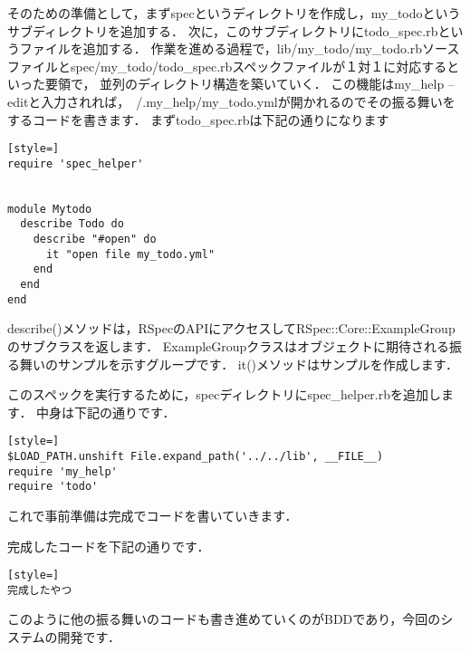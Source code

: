 そのための準備として，まずspecというディレクトリを作成し，my\_todoというサブディレクトリを追加する．
次に，このサブディレクトリにtodo\_spec.rbというファイルを追加する．
作業を進める過程で，lib/my\_todo/my\_todo.rbソースファイルとspec/my\_todo/todo\_spec.rbスペックファイルが１対１に対応するといった要領で，
並列のディレクトリ構造を築いていく．
この機能はmy\_help --editと入力されれば，~/.my\_help/my\_todo.ymlが開かれるのでその振る舞いをするコードを書きます．
まずtodo\_spec.rbは下記の通りになります
\begin{lstlisting}[style=]
require 'spec_helper'


module Mytodo
  describe Todo do
    describe "#open" do
      it "open file my_todo.yml" 
    end
  end
end

\end{lstlisting}
describe()メソッドは，RSpecのAPIにアクセスしてRSpec::Core::ExampleGroupのサブクラスを返します．
ExampleGroupクラスはオブジェクトに期待される振る舞いのサンプルを示すグループです．
it()メソッドはサンプルを作成します．

このスペックを実行するために，specディレクトリにspec\_helper.rbを追加します．
中身は下記の通りです．
\begin{lstlisting}[style=]
$LOAD_PATH.unshift File.expand_path('../../lib', __FILE__)
require 'my_help'
require 'todo'
\end{lstlisting}
これで事前準備は完成でコードを書いていきます．

完成したコードを下記の通りです．
\begin{lstlisting}[style=]
完成したやつ
\end{lstlisting}
このように他の振る舞いのコードも書き進めていくのがBDDであり，今回のシステムの開発です．

